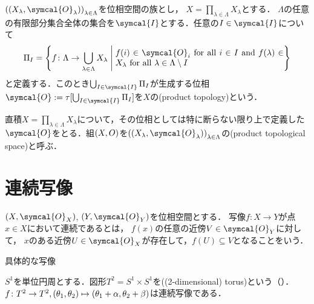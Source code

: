 \documentclass{ltjsbook}
\begin{document}
\begin{thmbox}
\begin{definition}
\({\tuple{\tuple{X_\lambda, \symcal{O}_\lambda}}}_{\lambda \in \Lambda}\)を位相空間の族とし，
\(X = \prod_{\lambda \in \Lambda} X_\lambda\)とする．
\(\Lambda\)の任意の有限部分集合全体の集合を\(\symcal{I}\)とする．任意の\(I \in \symcal{I}\)について
\begin{align*}
    \Pi_I = \left\{ f\colon \Lambda \to \bigcup_{\lambda \in \Lambda} X_\lambda \relmiddle{|} \text{\parbox{7cm}{\(f(i) \in \symcal{O}_i\) for all \(i \in I\) and \(f(\lambda) \in X_\lambda\) for all \(\lambda \in \Lambda \setminus I\)}}\right\}
\end{align*}
と定義する．このとき\(\bigcup_{I \in \symcal{I}} \Pi_I\)が生成する位相\(\symcal{O}:=\tau[\bigcup_{I \in \symcal{I}}\Pi_I]\)を\(X\)の(product topology)という．
\end{definition}
\end{thmbox}

直積\(X = \prod_{\lambda \in \Lambda} X_\lambda\)について，その位相としては特に断らない限り上で定義した\(\symcal{O}\)をとる．組\((X, O)\)を\({\tuple{\tuple{X_\lambda, \symcal{O}_\lambda}}}_{\lambda \in \Lambda}\)の(product topological space)と呼ぶ．

\section{連続写像}
\begin{thmbox}
\begin{definition}
\(\tuple{X, \symcal{O}_{X}}\), \(\tuple{Y, \symcal{O}_{Y}}\)を位相空間とする．
写像\(f\colon X \to Y\)が点\(x \in X\)において連続であるとは，
\(f(x)\)の任意の近傍\(V \in \symcal{O}_Y\)に対して，
\(x\)のある近傍\(U \in \symcal{O}_X\)が存在して，\(f(U) \subseteq V\)となることをいう．
\end{definition}
\end{thmbox}

具体的な写像

\begin{exa} \(S^1\)を単位円周とする．図形\(T^2 = S^1 \times S^1\)を((2-dimensional) torus)という（）．
\(f \colon T^2 \to T^2, (\theta_1, \theta_2) \mapsto (\theta_1 + \alpha, \theta_2 + \beta)\)は連続写像である．
\end{exa}
\end{document}
